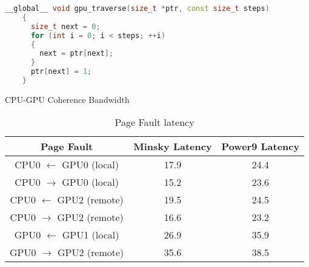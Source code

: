 \begin{lstlisting}[language=c++, caption=Linked List Traversal, label=lst:traversal]
    __global__ void gpu_traverse(size_t *ptr, const size_t steps)
    {
      size_t next = 0;
      for (int i = 0; i < steps; ++i)
      {
        next = ptr[next];
      }
      ptr[next] = 1;
    }
\end{lstlisting}

\begin{algorithm}
	\caption{CPU-GPU Coherence Bandwidth}
	\label{alg:um-coherence-bw}
	\begin{algorithmic}[1]
		\Statex
				
		\EndFunction
				
	\end{algorithmic}
\end{algorithm}


\begin{table}[h]
	\centering
	\caption[]{Page Fault latency}
	\label{tab:page-fault-latency}
	\begin{tabular}{|c|c|c|}
		\hline
		\textbf{Page Fault}              & \textbf{Minsky Latency} & \textbf{Power9 Latency} \\ \hline
		CPU0 $\leftarrow$ GPU0  (local)  & 17.9                    & 24.4                    \\ \hline
		CPU0 $\rightarrow$ GPU0 (local)  & 15.2                    & 23.6                    \\ \hline
		CPU0 $\leftarrow$ GPU2  (remote) & 19.5                    & 24.5                    \\ \hline
		CPU0 $\rightarrow$ GPU2 (remote) & 16.6                    & 23.2                    \\ \hline
		GPU0 $\leftarrow$ GPU1  (local)  & 26.9                    & 35.9                    \\ \hline
		GPU0 $\rightarrow$ GPU2 (remote) & 35.6                    & 38.5                    \\ \hline
	\end{tabular}
\end{table}


